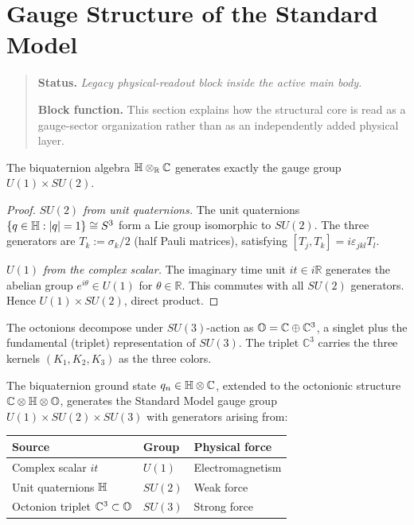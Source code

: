 \section{Gauge Structure of the Standard Model}
\begin{quote}\small
\noindent\textbf{Status.} \emph{Legacy physical-readout block inside the active main body.}\par
\noindent\textbf{Block function.} This section explains how the structural core is read as a gauge-sector organization rather than as an independently added physical layer.
\end{quote}
\label{sec:gauge}

\begin{proposition}
\label{prop:biquaternion-u1su2}
The biquaternion algebra $\mathbb{H}\otimes_{\mathbb{R}}\mathbb{C}$ generates
exactly the gauge group $U(1)\times SU(2)$.
\end{proposition}

\begin{proof}
\emph{$SU(2)$ from unit quaternions.}
The unit quaternions $\{q\in\mathbb{H}:|q|=1\}\cong S^3$ form a Lie group
isomorphic to $SU(2)$.
The three generators are $T_k:=\sigma_k/2$ (half Pauli matrices),
satisfying $[T_j,T_k]=i\varepsilon_{jkl}T_l$.

\emph{$U(1)$ from the complex scalar.}
The imaginary time unit $it\in i\mathbb{R}$ generates the abelian group
$e^{i\theta}\in U(1)$ for $\theta\in\mathbb{R}$.
This commutes with all $SU(2)$ generators.
Hence $U(1)\times SU(2)$, direct product.
\end{proof}

\begin{theorem}[$\OO\to SU(3)$]\label{thm:octonion-SU3}
The octonions decompose under $SU(3)$-action as
$\mathbb{O} = \mathbb{C}\oplus\mathbb{C}^3$,
a singlet plus the fundamental (triplet) representation of $SU(3)$.
The triplet $\mathbb{C}^3$ carries the three kernels $(K_1,K_2,K_3)$
as the three colors.
\end{theorem}

\begin{theorem}\label{thm:SM}
The biquaternion ground state $q_n\in\mathbb{H}\otimes\mathbb{C}$, extended to
the octonionic structure $\mathbb{C}\otimes\mathbb{H}\otimes\mathbb{O}$, generates
the Standard Model gauge group $U(1)\times SU(2)\times SU(3)$ with
generators arising from:
\begin{center}
\renewcommand{\arraystretch}{1.3}
\begin{tabular}{lll}
\toprule
Source & Group & Physical force\\
\midrule
Complex scalar $it$ & $U(1)$ & Electromagnetism\\
Unit quaternions $\mathbb{H}$ & $SU(2)$ & Weak force\\
Octonion triplet $\mathbb{C}^3\subset\mathbb{O}$ & $SU(3)$ & Strong force\\
\bottomrule
\end{tabular}
\end{center}
\end{theorem}

